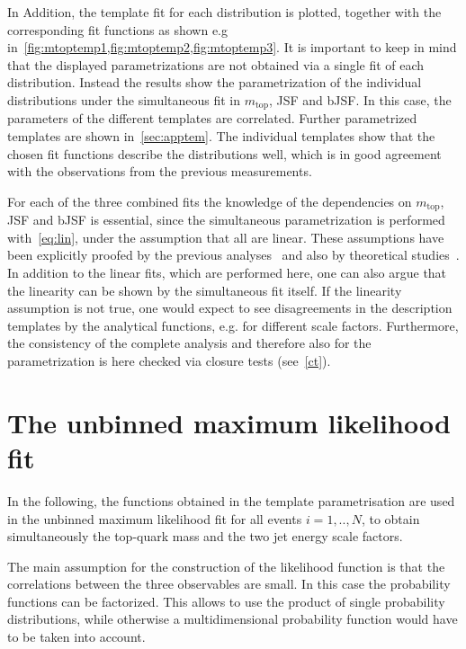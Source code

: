 In Addition, the template fit for each distribution is plotted, together with the corresponding fit functions as shown e.g in~\cref{fig:mtoptemp1,fig:mtoptemp2,fig:mtoptemp3}. It is important to keep in mind that the displayed parametrizations are not obtained via a single fit of each distribution. Instead the results show the parametrization of the individual distributions under the simultaneous fit in $m_{\text{top}}$, JSF and bJSF. In this case, the parameters of the different templates are correlated. Further parametrized templates are shown in~\cref{sec:apptem}. The individual templates show that the chosen fit functions describe the distributions well, which is in good agreement with the observations from the previous measurements.

For each of the three combined fits the knowledge of the dependencies on $m_{\text{top}}$, JSF and bJSF is essential, since the simultaneous parametrization is performed with~\cref{eq:lin}, under the assumption that all  are linear. 
These assumptions have been explicitly proofed by the previous analyses~\cite{Aad:2015nba,ATLAS-CONF-2017-071}  and also by theoretical studies~\cite{Heinrich:2017bqp}. In addition to the linear fits, which are performed here, one can also argue that the linearity can be shown by the simultaneous fit itself.  If the linearity assumption is not true, one would expect to see disagreements in the description  templates by the analytical functions, e.g. for different scale factors. Furthermore, the consistency of the complete analysis and therefore also for the parametrization is here checked via closure tests (see~\cref{ct}).




 
 




\section{The unbinned maximum likelihood fit}

In the following, the functions obtained in the template parametrisation are used in the unbinned maximum likelihood fit
for all events $i = 1,..,N$, to obtain simultaneously the top-quark mass and the two jet energy scale factors. 
 
 The main assumption for the construction of the likelihood function is that the correlations between the three observables are small. In this case the probability  functions can be factorized. This allows to use the product of single probability distributions, while otherwise a multidimensional probability function would have to be taken into account.



